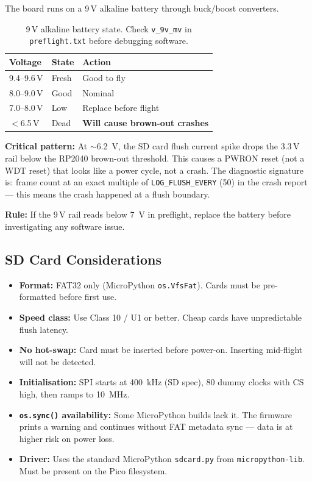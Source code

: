 \documentclass[11pt, a4paper, twoside]{article}
\newcommand{\config}[1]{\texttt{#1}}
\newcommand{\file}[1]{\texttt{#1}}
\newcommand{\danger}[1]{\textcolor{accentred}{\textbf{#1}}}
\begin{document}
The board runs on a 9\,V alkaline battery through buck/boost converters.

\begin{table}[ht]
\centering
\caption{9\,V alkaline battery state. Check \texttt{v\_9v\_mv} in \file{preflight.txt} before debugging software.}
\label{tab:battery}
\begin{tabular}{l l l}
\toprule
\textbf{Voltage} & \textbf{State} & \textbf{Action} \\
\midrule
9.4--9.6\,V & Fresh & Good to fly \\
8.0--9.0\,V & Good & Nominal \\
7.0--8.0\,V & Low & Replace before flight \\
$<$6.5\,V & Dead & \danger{Will cause brown-out crashes} \\
\bottomrule
\end{tabular}
\end{table}

\danger{Critical pattern:} At $\sim$\SI{6.2}{\volt}, the SD card flush current spike drops the 3.3\,V rail below the RP2040 brown-out threshold. This causes a PWRON reset (not a WDT reset) that looks like a power cycle, not a crash. The diagnostic signature is: frame count at an exact multiple of \config{LOG\_FLUSH\_EVERY} (50) in the crash report --- this means the crash happened at a flush boundary.

\textbf{Rule:} If the 9\,V rail reads below \SI{7}{\volt} in preflight, replace the battery before investigating any software issue.

\subsection{SD Card Considerations}
\label{sec:sd-notes}

\begin{itemize}
    \item \textbf{Format:} FAT32 only (MicroPython \texttt{os.VfsFat}). Cards must be pre-formatted before first use.
    \item \textbf{Speed class:} Use Class 10 / U1 or better. Cheap cards have unpredictable flush latency.
    \item \textbf{No hot-swap:} Card must be inserted before power-on. Inserting mid-flight will not be detected.
    \item \textbf{Initialisation:} SPI starts at \SI{400}{\kilo\hertz} (SD spec), 80 dummy clocks with CS high, then ramps to \SI{10}{\mega\hertz}.
    \item \textbf{\texttt{os.sync()} availability:} Some MicroPython builds lack it. The firmware prints a warning and continues without FAT metadata sync --- data is at higher risk on power loss.
    \item \textbf{Driver:} Uses the standard MicroPython \texttt{sdcard.py} from \texttt{micropython-lib}. Must be present on the Pico filesystem.
\end{itemize}
\end{document}
